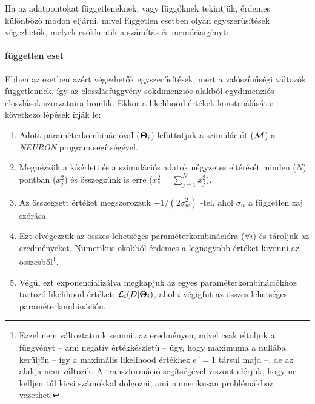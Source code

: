 Ha az adatpontokat függetleneknek, vagy függőknek tekintjük, érdemes különböző módon eljárni, mivel független esetben olyan egyszerűsítések végezhetők, melyek csökkentik a számítás és memóriaigényt:
 
 \paragraph{független eset}
Ebben az esetben azért végezhetők egyszerűsítések, mert a valószínűségi változók függetlennek, így az eloszlásfüggvény sokdimenziós alakból egydimenziós eloszlások szorzataira bomlik. Ekkor a likelihood értékek konstruálását a következő lépések írják le:
\begin{enumerate}\label{meth:independet}
	\item Adott paraméterkombinációval ($\mbox{\boldmath$ \Theta $}_i$) lefuttatjuk a szimulációt ($\mathcal{M}$) a \textit{NEURON} program segítségével.
	\item Megnézzük a kísérleti és a szimulációs adatok négyzetes eltérését minden ($N$) pontban ($x_j^2$) és összegzünk is erre ($x_s^2 = \sum_{j=1}^{N} x_j^2$).
	\item Az összegzett értéket megszorozzuk $-1/(2 \sigma_w^2)$ -tel, ahol $\sigma_w$ a független zaj szórása.
	\item Ezt elvégezzük az összes lehetséges paraméterkombinációra ($\forall i$) és tároljuk az eredményeket. Numerikus okokból érdemes a legnagyobb értéket kivonni az összesből\footnote{Ezzel nem változtatunk semmit az eredményen, mivel csak eltoljuk a függvényt -- ami negatív értékkészletű --  úgy, hogy maximuma a nullába kerüljön -- így a maximális likelihood értékhez $e^0 = 1$ társul majd --, de az alakja nem változik. A transzformáció segítségével viszont elérjük, hogy ne kelljen túl kicsi számokkal dolgozni, ami numerikusan problémákhoz vezethet.}.
	\item Végül ezt exponencializálva megkapjuk az egyes paraméterkombinációkhoz tartozó likelihood értéket: $ \mathcal{L}_i(D|\mbox{\boldmath$ \Theta $}_i)$, ahol $i$ végigfut az összes lehetséges paraméterkombináción.
\end{enumerate}

